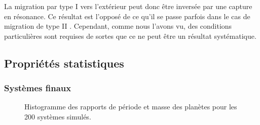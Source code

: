 La migration par type I vers l'extérieur peut donc être inversée par une capture en résonance. Ce résultat est l'opposé de ce
qu'il se passe parfois dans le cas de migration de type II \citep[grand tack model]{masset2001reversing, morbidelli2007dynamics,
pierens2011twophase}. Cependant, comme nous l'avons vu, des conditions particulières sont requises de sortes que ce ne peut être
un résultat systématique.


\subsection{Propriétés statistiques}
\subsubsection{Systèmes finaux}
\begin{figure}[htbp]
\centering
{}\hfill
{}

\caption{Histogramme des rapports de période et masse des planètes pour les 200 systèmes simulés.}
\end{figure}

